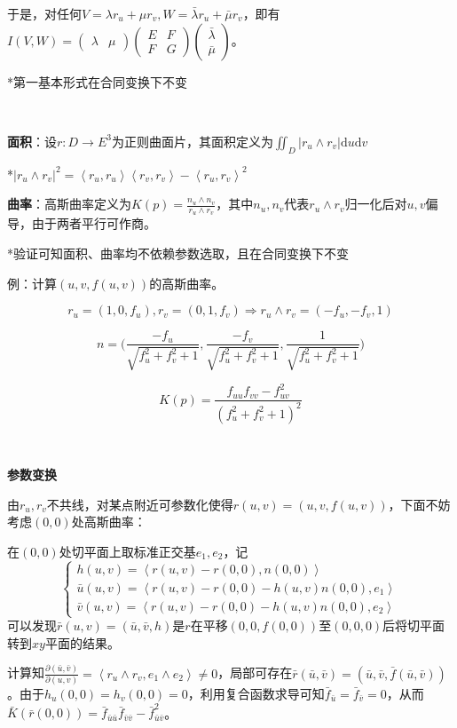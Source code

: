 \documentclass[a4paper,UTF8,fontset=windows]{ctexart}
\begin{document}
于是，对任何$V=\lambda r_u+\mu r_v,W=\bar{\lambda}r_u+\bar{\mu}r_v$，即有$I(V,W)=\begin{pmatrix}\lambda&\mu\end{pmatrix}\begin{pmatrix}E&F\\F&G\end{pmatrix}\begin{pmatrix}\bar{\lambda}\\\bar{\mu}\end{pmatrix}$。

*第一基本形式在合同变换下不变

\

\textbf{面积}：设$r:D\to E^3$为正则曲面片，其面积定义为$\iint_D|r_u\wedge r_v|\mathrm{d}u\mathrm{d}v$

*$|r_u\wedge r_v|^2=\left<r_u,r_u\right>\left<r_v,r_v\right>-\left<r_u,r_v\right>^2$

\textbf{曲率}：高斯曲率定义为$K(p)=\frac{n_u\wedge n_v}{r_u\wedge r_v}$，其中$n_u,n_v$代表$r_u\wedge r_v$归一化后对$u,v$偏导，由于两者平行可作商。

*验证可知面积、曲率均不依赖参数选取，且在合同变换下不变

例：计算$(u,v,f(u,v))$的高斯曲率。

$$r_u=(1,0,f_u),r_v=(0,1,f_v)\Rightarrow r_u\wedge r_v=(-f_u,-f_v,1)$$

$$n=\big(\frac{-f_u}{\sqrt{f_u^2+f_v^2+1}},\frac{-f_v}{\sqrt{f_u^2+f_v^2+1}},\frac{1}{\sqrt{f_u^2+f_v^2+1}}\big)$$

$$K(p)=\frac{f_{uu}f_{vv}-f_{uv}^2}{(f_u^2+f_v^2+1)^2}$$

\

\textbf{参数变换}

由$r_u,r_v$不共线，对某点附近可参数化使得$r(u,v)=(u,v,f(u,v))$，下面不妨考虑$(0,0)$处高斯曲率：

在$(0,0)$处切平面上取标准正交基$e_1,e_2$，记
$$\begin{cases}h(u,v)=\left<r(u,v)-r(0,0),n(0,0)\right>\\\bar{u}(u,v)=\left<r(u,v)-r(0,0)-h(u,v)n(0,0),e_1\right>\\\bar{v}(u,v)=\left<r(u,v)-r(0,0)-h(u,v)n(0,0),e_2\right>\end{cases}$$
可以发现$\bar{r}(u,v)=(\bar{u},\bar{v},h)$是$r$在平移$(0,0,f(0,0))$至$(0,0,0)$后将切平面转到$xy$平面的结果。

计算知$\frac{\partial(\bar{u},\bar{v})}{\partial(u,v)}=\left<r_u\wedge r_v,e_1\wedge e_2\right>\ne0$，局部可存在$\bar{r}(\bar{u},\bar{v})=(\bar{u},\bar{v},\bar{f}(\bar{u},\bar{v}))$。由于$h_u(0,0)=h_v(0,0)=0$，利用复合函数求导可知$\bar{f}_{\bar{u}}=\bar{f}_{\bar{v}}=0$，从而$\bar{K}(\bar{r}(0,0))=\bar{f}_{\bar{u}\bar{u}}\bar{f}_{\bar{v}\bar{v}}-\bar{f}_{\bar{u}\bar{v}}^2$。
\end{document}
